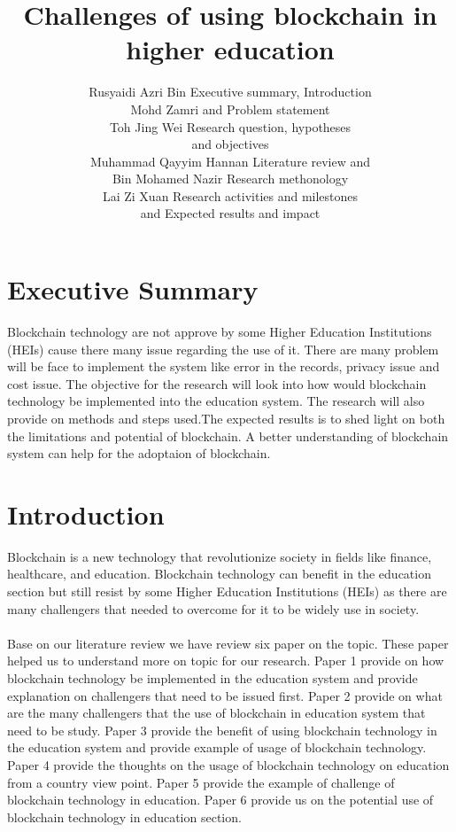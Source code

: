 \documentclass[a4paper, 12pt]{article}
\author{
Rusyaidi Azri Bin \quad 1211108129 \quad Executive summary, Introduction 
\\ Mohd Zamri \quad \hspace{4cm} \quad and Problem statement\\
Toh Jing Wei \quad 1211109475 \quad Research question, hypotheses\\ \quad \hspace{4cm} \quad and objectives \\ Muhammad Qayyim Hannan \quad 1211111107 \quad Literature review and\\ Bin Mohamed Nazir \quad \hspace{4cm} \quad Research methonology\\
Lai Zi Xuan \quad 1211109451 \quad Research activities and milestones\\ \quad \hspace{5cm} \quad and Expected results and impact
}
\title{ Challenges of using blockchain in higher education  }
\begin{document}
\maketitle

\section*{Executive Summary}
Blockchain technology are not approve by some Higher Education Institutions (HEIs) cause there many issue regarding the use of it. There are many problem will be face to implement the system like error in the records, privacy issue and cost issue. The objective for the research will look into how would blockchain technology be implemented into the education system. The research will also provide on methods and steps used.The expected results is to shed light on both the limitations and potential of blockchain. A better understanding of blockchain system can help for the adoptaion of blockchain.\\

\section{Introduction}
Blockchain is a new technology that revolutionize society in fields like finance, healthcare, and education. Blockchain technology can benefit in the education section but still resist by some Higher Education Institutions (HEIs) as there are many challengers that needed to overcome for it to be widely use in society.\\ \\
Base on our literature review we have review six paper on the topic. These paper helped us to understand more on topic for our research. Paper 1 \cite{p1} provide on how blockchain technology be implemented in the education system and provide explanation on challengers that need to be
issued first. Paper 2 \cite{p2} provide on what are the many challengers that the use of blockchain in education system that need to be study. Paper 3 \cite{p3} provide the benefit of using blockchain technology in the education system and provide example of usage of blockchain technology. Paper 4 \cite{p4} provide the thoughts on the usage of blockchain technology on education from a country view point. Paper 5 \cite{p5} provide the example of challenge of blockchain technology in education. Paper 6 \cite{p6} provide us on the potential use of blockchain technology in education section.
\end{document}

